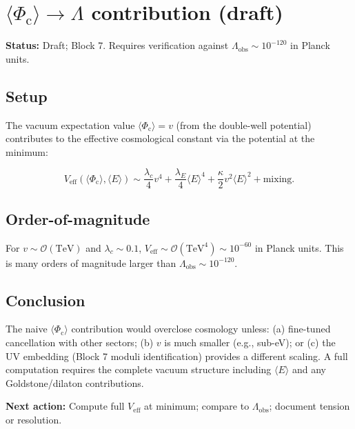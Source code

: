 \documentclass[11pt]{article}
\newcommand{\Phic}{\Phi_{\mathrm{c}}}
\newcommand{\Eth}{E}
\begin{document}
\section*{$\langle\Phic\rangle \to \Lambda$ contribution (draft)}

\textbf{Status:} Draft; Block 7. Requires verification against $\Lambda_{\mathrm{obs}} \sim 10^{-120}$ in Planck units.

\subsection*{Setup}

The vacuum expectation value $\langle\Phic\rangle = v$ (from the double-well potential) contributes to the effective cosmological constant via the potential at the minimum:

\[
V_{\mathrm{eff}}(\langle\Phic\rangle, \langle\Eth\rangle) \sim \frac{\lambda_c}{4}v^4 + \frac{\lambda_E}{4}\langle\Eth\rangle^4 + \frac{\kappa}{2}v^2\langle\Eth\rangle^2 + \text{mixing}.
\]

\subsection*{Order-of-magnitude}

For $v \sim \mathcal{O}(\mathrm{TeV})$ and $\lambda_c \sim 0.1$, $V_{\mathrm{eff}} \sim \mathcal{O}(\mathrm{TeV}^4) \sim 10^{-60}$ in Planck units. This is many orders of magnitude larger than $\Lambda_{\mathrm{obs}} \sim 10^{-120}$.

\subsection*{Conclusion}

The naive $\langle\Phic\rangle$ contribution would overclose cosmology unless: (a) fine-tuned cancellation with other sectors; (b) $v$ is much smaller (e.g., sub-eV); or (c) the UV embedding (Block 7 moduli identification) provides a different scaling. A full computation requires the complete vacuum structure including $\langle\Eth\rangle$ and any Goldstone/dilaton contributions.

\textbf{Next action:} Compute full $V_{\mathrm{eff}}$ at minimum; compare to $\Lambda_{\mathrm{obs}}$; document tension or resolution.
\end{document}
